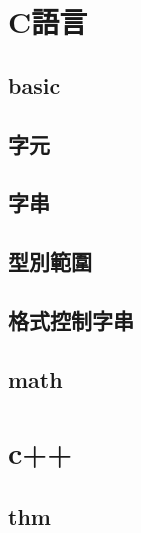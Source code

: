 \section{C語言}
    \subsection{basic}
        
    \subsection{字元}
        
    \subsection{字串}
        
    \subsection{型別範圍}
        
    \subsection{格式控制字串}
        
    \subsection{math}
        

\section{c++}
    \subsection{thm}
        